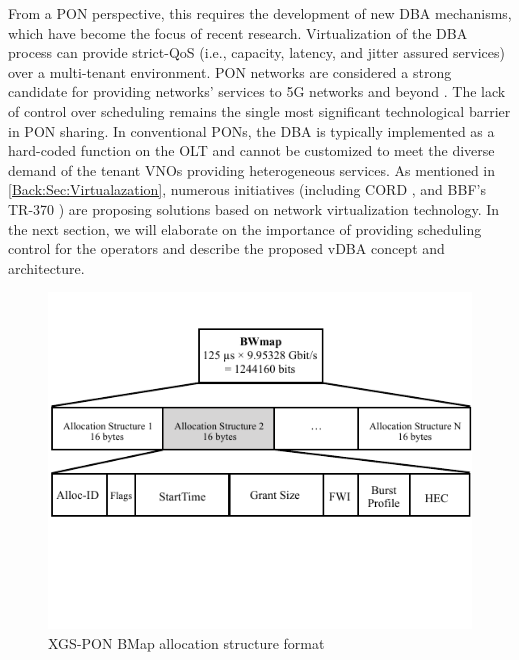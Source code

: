 From a \ac{PON} perspective, this requires the development of new \ac{DBA} mechanisms, which have become the focus of recent research. Virtualization of the \ac{DBA} process can provide strict-\ac{QoS} (i.e., capacity, latency, and jitter assured services) over a multi-tenant environment. \ac{PON} networks are considered a strong candidate for providing networks' services to 5G networks and beyond \cite{8412589}. The lack of control over scheduling remains the single most significant technological barrier in \ac{PON} sharing. In conventional \acp{PON}, the \ac{DBA} is typically implemented as a hard-coded function on the \ac{OLT} and cannot be customized to meet the diverse demand of the tenant \acp{VNO} providing heterogeneous services. As mentioned in \autoref{Back:Sec:Virtualazation}, numerous initiatives (including CORD \cite{7588276}, and \ac{BBF}'s TR-370 \cite{bbfTR370}) are proposing solutions based on network virtualization technology.
In the next section, we will elaborate on the importance of providing scheduling control for the operators and describe the proposed \ac{vDBA} concept and architecture.
\begin{figure}%
\centering
 \includegraphics[width=0.8\columnwidth]{Figures/BMap.pdf}
\caption{XGS-\ac{PON} \ac{BMap} allocation structure format}
\vspace{-2mm}
\label{BMap}
\end{figure}
